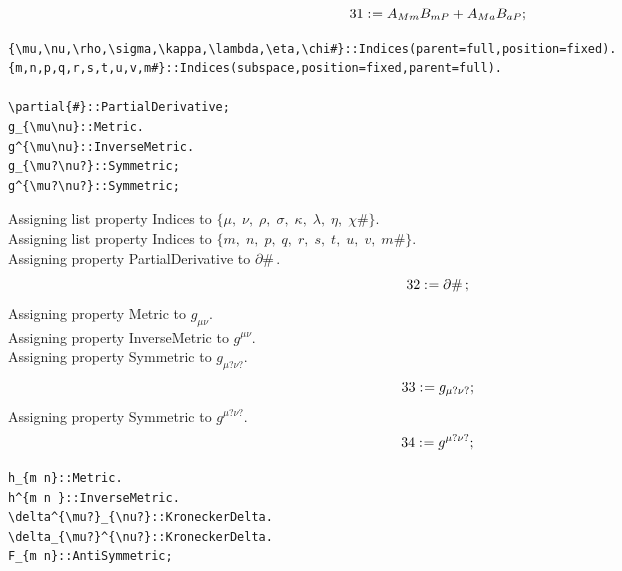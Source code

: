 \documentclass[11pt]{article}
\def\specialcolon{\mathrel{\mathop{:}}\hspace{-.5em}}
\begin{document}
\begin{dmath*}[compact, spread=2pt]
31\specialcolon{}= {A}_{M m} {B}_{m P} + {A}_{M a} {B}_{a P};
\end{dmath*}
{\color[named]{Blue}\begin{verbatim}
{\mu,\nu,\rho,\sigma,\kappa,\lambda,\eta,\chi#}::Indices(parent=full,position=fixed).
{m,n,p,q,r,s,t,u,v,m#}::Indices(subspace,position=fixed,parent=full).

\partial{#}::PartialDerivative;
g_{\mu\nu}::Metric.
g^{\mu\nu}::InverseMetric.
g_{\mu?\nu?}::Symmetric;
g^{\mu?\nu?}::Symmetric;
\end{verbatim}}
Assigning list property Indices to $\{\mu,\; \nu,\; \rho,\; \sigma,\; \kappa,\; \lambda,\; \eta,\; \chi\#\}$.
\\
Assigning list property Indices to $\{m,\; n,\; p,\; q,\; r,\; s,\; t,\; u,\; v,\; m\#\}$.
\\
Assigning property PartialDerivative to $\partial{\#}\, $.
\\
\begin{dmath*}[compact, spread=2pt]
32\specialcolon{}= \partial{\#}\, ;
\end{dmath*}
Assigning property Metric to ${g}_{\mu \nu}$.
\\
Assigning property InverseMetric to ${g}^{\mu \nu}$.
\\
Assigning property Symmetric to ${g}_{\mu? \nu?}$.
\\
\begin{dmath*}[compact, spread=2pt]
33\specialcolon{}= {g}_{\mu? \nu?};
\end{dmath*}
Assigning property Symmetric to ${g}^{\mu? \nu?}$.
\\
\begin{dmath*}[compact, spread=2pt]
34\specialcolon{}= {g}^{\mu? \nu?};
\end{dmath*}
{\color[named]{Blue}\begin{verbatim}
h_{m n}::Metric.
h^{m n }::InverseMetric.
\delta^{\mu?}_{\nu?}::KroneckerDelta.
\delta_{\mu?}^{\nu?}::KroneckerDelta.
F_{m n}::AntiSymmetric;
\end{verbatim}}
\end{document}
